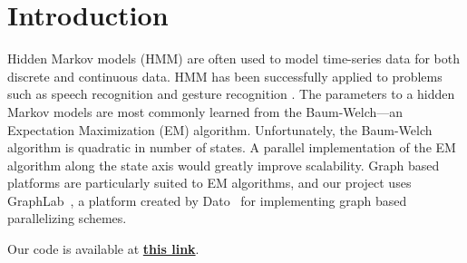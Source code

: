 \section{Introduction}

Hidden Markov models (HMM) are often used to model time-series data for both
discrete and continuous data. HMM has been successfully applied to problems such as speech recognition \cite{hmm-speech} and gesture recognition \cite{hmm-gesture}. The
parameters to a hidden Markov models are most commonly learned from the
Baum-Welch---an Expectation Maximization (EM) algorithm. Unfortunately, the
Baum-Welch algorithm is quadratic in number of states. A parallel implementation
of the EM algorithm along the state axis would greatly improve scalability.
Graph based platforms are particularly suited to EM algorithms, and our project
uses GraphLab~\cite{graphlab}, a platform created by Dato~\cite{dato} for implementing graph based parallelizing schemes. 

Our code is available at
\textbf{\href{https://github.com/cs205-project-group/hmm}{this link}}.
